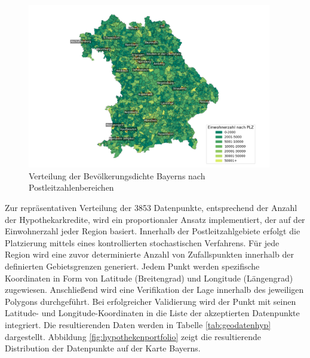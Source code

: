 \begin{figure}[htbp]
    \centering
    \includegraphics[width=0.95\textwidth]{figures/Bayern_pop_plz.png}
    \caption{Verteilung der Bevölkerungsdichte Bayerns nach Postleitzahlenbereichen}
    \label{fig:bevoelkerungsdichte}
\end{figure}
\clearpage  

Zur repräsentativen Verteilung der 3853 Datenpunkte, entsprechend der Anzahl der Hypothekarkredite, wird ein proportionaler Ansatz implementiert, der auf der Einwohnerzahl jeder Region basiert. Innerhalb der Postleitzahlgebiete erfolgt die Platzierung mittels eines kontrollierten stochastischen Verfahrens. Für jede Region wird eine zuvor determinierte Anzahl von Zufallspunkten innerhalb der definierten Gebietsgrenzen generiert. Jedem Punkt werden spezifische Koordinaten in Form von Latitude (Breitengrad) und Longitude (Längengrad) zugewiesen. Anschließend wird eine Verifikation der Lage innerhalb des jeweiligen Polygons durchgeführt. Bei erfolgreicher Validierung wird der Punkt mit seinen Latitude- und Longitude-Koordinaten in die Liste der akzeptierten Datenpunkte integriert. Die resultierenden Daten werden in Tabelle \ref{tab:geodatenhyp} dargestellt. Abbildung \ref{fig:hypothekenportfolio} zeigt die resultierende Distribution der Datenpunkte auf der Karte Bayerns.

